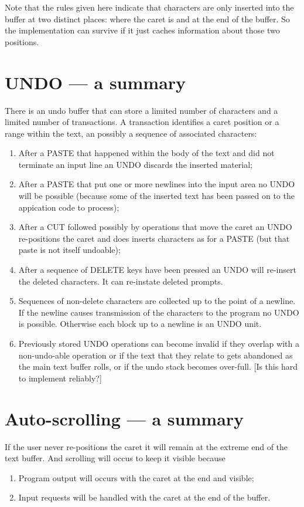 \documentclass[a4paper,11pt]{article}
\begin{document}
Note that the rules given here indicate that characters are only inserted into
the buffer at two distinct places: where the caret is and at the end of the
buffer. So the implementation can survive if it just caches information about
those two positions.

\section{UNDO --- a summary}
There is an undo buffer that can store a limited number of characters
and a limited number of transactions. A transaction identifies a caret
position or a range within the text, an possibly a sequence of associated
characters:
\begin{enumerate}
\item After a PASTE that happened within the body of the text and did not
    terminate an input line an UNDO discards the inserted material;
\item After a PASTE that put one or more newlines into the input area no
    UNDO will be possible (because some of the inserted text has been passed
    on to the appication code to process);
\item After a CUT followed possibly by operations that move the caret an UNDO
    re-positions the caret and does inserts characters as for a PASTE (but
    that paste is not itself undoable);
\item After a sequence of DELETE keys have been pressed an UNDO will re-insert
    the deleted characters. It can re-instate deleted prompts.
\item Sequences of non-delete characters are collected up to the point of
    a newline. If the newline causes transmission of the characters to
    the program no UNDO is possible. Otherwise each block up to a newline
    is an UNDO unit.
\item Previously stored UNDO operations can become invalid if they overlap
    with a non-undo-able operation or if the text that they relate to gets
    abandoned as the main text buffer rolls, or if the undo stack becomes
    over-full. [Is this hard to implement reliably?]
\end{enumerate}

\section{Auto-scrolling --- a summary}
If the user never re-positions the caret it will remain at the extreme end of
the text buffer. And scrolling will occus to keep it visible because
\begin{enumerate}
\item Program output will occurs with the caret at the end and visible;
\item Input requests will be handled with the caret at the end of the buffer.
\end{enumerate}
\end{document}
